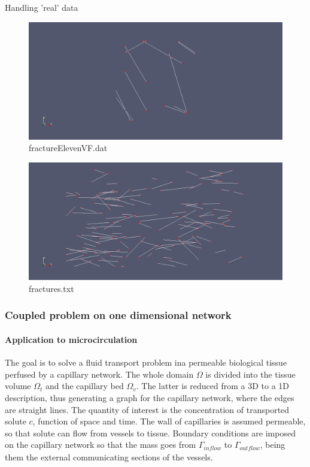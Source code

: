 \documentclass[11pt]{beamer}
\begin{document}
	\begin{frame}{Handling 'real' data}
		\begin{figure}
			\centering 
			\includegraphics[width=.9\textwidth]{"graph1"}
			\caption{fractureElevenVF.dat}
		\end{figure}
	\end{frame}

	\begin{frame}
		\begin{figure}
			\centering 
			\includegraphics[width=.9\textwidth]{"graph2"}
			\caption{fractures.txt}
		\end{figure}
	\end{frame}

		\begin{frame}
		\frametitle{Coupled problem on one dimensional network}
		\framesubtitle{Application to microcirculation}
		The goal is to solve a fluid transport problem ina permeable biological tissue perfused by a capillary network. The whole domain $\Omega$ is divided into the tissue volume $\Omega_{t}$ and the capillary bed $\Omega_{v}$. The latter is reduced from a 3D to a 1D description, thus generating a graph for the capillary network, where the edges are straight lines.
		\newline\newline
		The quantity of interest is the concentration of transported solute $c$, function of space and time. The wall of capillaries is assumed permeable, so that solute can flow from vessels to tissue.
		\newline\newline
		Boundary conditions are imposed on the capillary network so that the mass goes from $\Gamma_{\textit{inflow}}$ to $\Gamma_{\textit{outflow}}$, being them the external communicating sections of the vessels.
	\end{frame}
	
\end{document}
